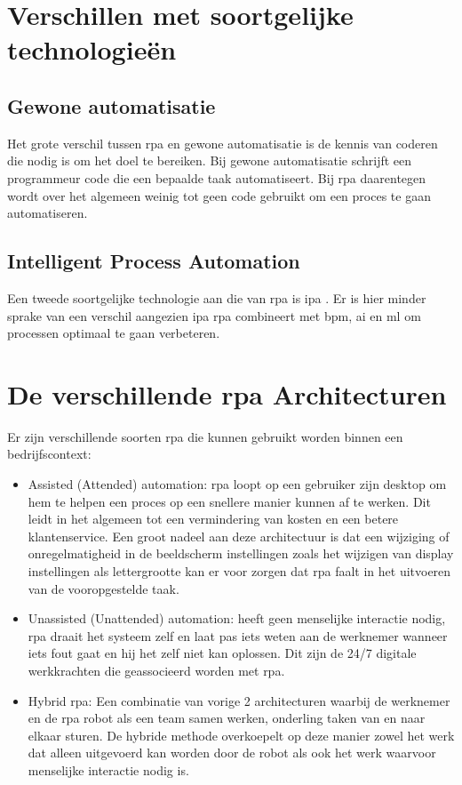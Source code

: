 \section{Verschillen met soortgelijke technologieën}

\subsection{Gewone automatisatie}
Het grote verschil tussen \acrshort{rpa} en gewone automatisatie is de kennis van coderen die nodig is om het doel te bereiken. Bij gewone automatisatie schrijft een programmeur code die een bepaalde taak automatiseert. Bij \acrshort{rpa} daarentegen wordt over het algemeen weinig tot geen code gebruikt om een proces te gaan automatiseren. \autocite{rpaVsScript}

\subsection{Intelligent Process Automation}
Een tweede soortgelijke technologie aan die van \acrshort{rpa} is \acrfull{ipa} . Er is hier minder sprake van een verschil aangezien \acrshort{ipa} \acrshort{rpa} combineert met \acrshort{bpm}, \acrshort{ai} en \acrfull{ml} om processen optimaal te gaan verbeteren.
\autocite{everythingRPA}

\section{De verschillende \acrshort{rpa} Architecturen}
Er zijn verschillende soorten \acrshort{rpa} die kunnen gebruikt worden binnen een bedrijfscontext:

\begin{itemize}
	\item Assisted (Attended) automation: \acrshort{rpa} loopt op een gebruiker zijn desktop om hem te helpen een proces op een snellere manier kunnen af te werken. Dit leidt in het algemeen tot een vermindering van kosten en een betere klantenservice. Een groot nadeel aan deze architectuur is dat een wijziging of onregelmatigheid in de beeldscherm instellingen zoals het wijzigen van display instellingen als lettergrootte kan er voor zorgen dat \acrshort{rpa} faalt in het uitvoeren van de vooropgestelde taak.
	\item Unassisted (Unattended) automation: heeft geen menselijke interactie nodig, \acrshort{rpa} draait het systeem zelf en laat pas iets weten aan de werknemer wanneer iets fout gaat en hij het zelf niet kan oplossen. Dit zijn de 24/7 digitale werkkrachten die geassocieerd worden met \acrshort{rpa}.
	\item Hybrid \acrshort{rpa}: Een combinatie van vorige 2 architecturen waarbij de werknemer en de \acrshort{rpa} robot als een team samen werken, onderling taken van en naar elkaar sturen. De hybride methode overkoepelt op deze manier zowel het werk dat alleen uitgevoerd kan worden door de robot als ook het werk waarvoor menselijke interactie nodig is.
\end{itemize}

